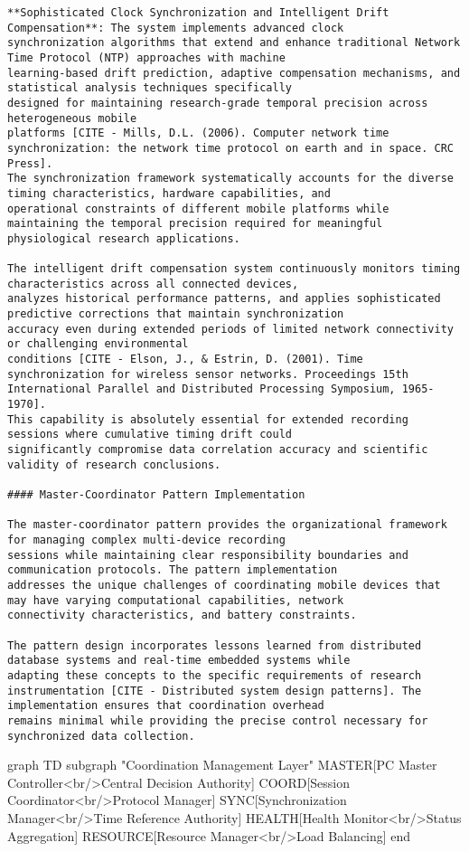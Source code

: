 \documentclass[12pt,a4paper]{report}
\begin{document}
\begin{verbatim}
**Sophisticated Clock Synchronization and Intelligent Drift Compensation**: The system implements advanced clock
synchronization algorithms that extend and enhance traditional Network Time Protocol (NTP) approaches with machine
learning-based drift prediction, adaptive compensation mechanisms, and statistical analysis techniques specifically
designed for maintaining research-grade temporal precision across heterogeneous mobile
platforms [CITE - Mills, D.L. (2006). Computer network time synchronization: the network time protocol on earth and in space. CRC Press].
The synchronization framework systematically accounts for the diverse timing characteristics, hardware capabilities, and
operational constraints of different mobile platforms while maintaining the temporal precision required for meaningful
physiological research applications.

The intelligent drift compensation system continuously monitors timing characteristics across all connected devices,
analyzes historical performance patterns, and applies sophisticated predictive corrections that maintain synchronization
accuracy even during extended periods of limited network connectivity or challenging environmental
conditions [CITE - Elson, J., & Estrin, D. (2001). Time synchronization for wireless sensor networks. Proceedings 15th International Parallel and Distributed Processing Symposium, 1965-1970].
This capability is absolutely essential for extended recording sessions where cumulative timing drift could
significantly compromise data correlation accuracy and scientific validity of research conclusions.

#### Master-Coordinator Pattern Implementation

The master-coordinator pattern provides the organizational framework for managing complex multi-device recording
sessions while maintaining clear responsibility boundaries and communication protocols. The pattern implementation
addresses the unique challenges of coordinating mobile devices that may have varying computational capabilities, network
connectivity characteristics, and battery constraints.

The pattern design incorporates lessons learned from distributed database systems and real-time embedded systems while
adapting these concepts to the specific requirements of research
instrumentation [CITE - Distributed system design patterns]. The implementation ensures that coordination overhead
remains minimal while providing the precise control necessary for synchronized data collection.

\end{verbatim}
graph TD
    subgraph "Coordination Management Layer"
        MASTER[PC Master Controller<br/>Central Decision Authority]
        COORD[Session Coordinator<br/>Protocol Manager]
        SYNC[Synchronization Manager<br/>Time Reference Authority]
        HEALTH[Health Monitor<br/>Status Aggregation]
        RESOURCE[Resource Manager<br/>Load Balancing]
    end
\end{document}
